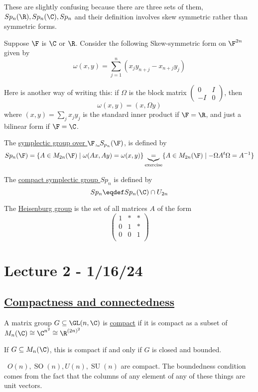 \documentclass[x11names,reqno,14pt]{extarticle}
\newcommand{\pmat}[4]{\begin{pmatrix} #1 & #2 \\ #3 & #4 \end{pmatrix}}
\DeclareMathOperator{\SU}{SU}
\DeclareMathOperator{\SO}{SO}
\begin{document}
These are slightly confusing because there are three sets of them, $Sp_{n}(\R), Sp_{n}(\C), Sp_{n}$ and their definition involves skew symmetric rather than symmetric forms. 

Suppose $\F$ is $\C$ or $\R$. Consider the following Skew-symmetric form on $\F^{2n}$ given by 
\[
\omega(x, y) = \sum_{j=1}^n (x_jy_{n+j} - x_{n+j}y_j)
\]

Here is another way of writing this: if $\Omega$ is the block matrix $\pmat{0}{I}{-I}{0}$, then 
\[
\omega(x, y) = ( x, \Omega y )
\]
where $(x, y) = \sum_j x_jy_j$ is the standard inner product if $\F = \R$, and just a bilinear form if $\F = \C$.


The \underline{symplectic group over $\F$, $S_{p_n}(\F)$}, is defined by
\[
Sp_{n}(\F) = \{A \in M_{2n}(\F) \mid \omega(Ax, Ay) = \omega(x, y)\} \underbrace{=}_{\text{exercise}} \{A \in M_{2n}(\F) \mid -\Omega A^t \Omega = A^{-1}\}
\]

The \underline{compact symplectic group $Sp_n$} is defined by 
\[
Sp_n \eqdef Sp_n(\C) \cap U_{2n}
\]

The \underline{Heisenburg group} is the set of all matrices $A$ of the form 
\[
\begin{pmatrix}
1 & * & * \\
0 & 1 & * \\
0 & 0 & 1 \\
\end{pmatrix}
\]

\section*{Lecture 2 - 1/16/24}

\subsection*{\underline{Compactness and connectedness}}


A matrix group $G \subseteq \GL(n,\C)$ is \underline{compact} if it is compact as a subset of $M_n(\C) \cong \C^{n^2} \cong \R^{(2n)^2}$

If $G \subseteq M_n(\C)$, this is compact if and only if $G$ is closed and bounded. 

\exm
\,
$O(n), \SO(n), U(n), \SU(n)$ are compact. The boundedness condition comes from the fact that the columns of any element of any of these things are unit vectors. 
\end{document}
